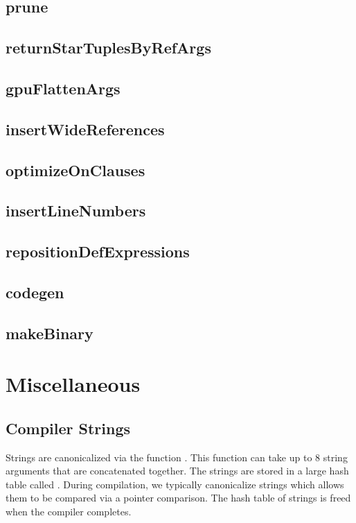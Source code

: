 \documentclass[10pt]{article}
\begin{document}
\subsection{prune}
\subsection{returnStarTuplesByRefArgs}
\subsection{gpuFlattenArgs}
\subsection{insertWideReferences}
\subsection{optimizeOnClauses}
\subsection{insertLineNumbers}
\subsection{repositionDefExpressions}
\subsection{codegen}
\subsection{makeBinary}

\section{Miscellaneous}
\label{sec:misc}

\subsection{Compiler Strings}
\label{sec:strings}

Strings are canonicalized via the function .  This function
can take up to 8 string arguments that are concatenated together.  The
strings are stored in a large hash table called
.  During compilation, we typically
canonicalize strings which allows them to be compared via a pointer
comparison.  The hash table of strings is freed when the compiler
completes.
\end{document}
